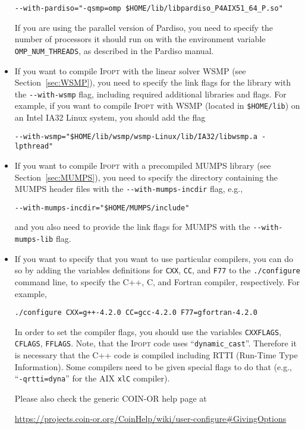 \documentclass[10pt]{article}
\newcommand{\Ipopt}{\textsc{Ipopt}\xspace}
\begin{document}
\begin{itemize}
  \verb|--with-pardiso="-qsmp=omp $HOME/lib/libpardiso_P4AIX51_64_P.so"|  %

  If you are using the parallel version of Pardiso, you need to
  specify the number of processors it should run on with the
  environment variable \verb|OMP_NUM_THREADS|, as described in the
  Pardiso manual.

\item If you want to compile \Ipopt with the linear solver WSMP (see
  Section~\ref{sec:WSMP}), you need to specify the link flags for the
  library with the \verb|--with-wsmp| flag, including required
  additional libraries and flags.  For example, if you want to compile
  \Ipopt with WSMP (located in {\tt \$HOME/lib}) on an Intel IA32
  Linux system, you should add the flag

  \verb|--with-wsmp="$HOME/lib/wsmp/wsmp-Linux/lib/IA32/libwsmp.a -lpthread"| %

\item If you want to compile \Ipopt with a precompiled MUMPS library
  (see Section~\ref{sec:MUMPS}), you need to specify the directory containing
  the MUMPS header files with the \verb|--with-mumps-incdir| flag,
  e.g.,

  \verb|--with-mumps-incdir="$HOME/MUMPS/include"|  %

  and you also need to provide the link flags for MUMPS with the
  \verb|--with-mumps-lib| flag.

\item If you want to specify that you want to use particular
  compilers, you can do so by adding the variables definitions for
  {\tt CXX}, {\tt CC}, and {\tt F77} to the {\tt ./configure} command
  line, to specify the C++, C, and Fortran compiler, respectively.
  For example,

  {\tt ./configure CXX=g++-4.2.0 CC=gcc-4.2.0 F77=gfortran-4.2.0}

  In order to set the compiler flags, you should use the variables
  {\tt CXXFLAGS}, {\tt CFLAGS}, {\tt FFLAGS}.  Note, that the \Ipopt
  code uses ``{\tt dynamic\_cast}''.  Therefore it is necessary that
  the C++ code is compiled including RTTI (Run-Time Type Information).
  Some compilers need to be given special flags to do that (e.g.,
  ``{\tt -qrtti=dyna}'' for the AIX {\tt xlC} compiler).

  Please also check the generic COIN-OR help page at

  \centerline{\url{https://projects.coin-or.org/CoinHelp/wiki/user-configure\#GivingOptions}}


\end{itemize}
\end{document}
